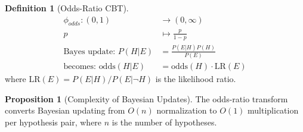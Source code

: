 \documentclass[11pt]{article}
\theoremstyle{definition}
\newtheorem{definition}{Definition}
\newtheorem{proposition}{Proposition}
\begin{document}
\begin{definition}[Odds-Ratio CBT]
\begin{align}
\phi_{odds}: (0,1) &\to (0,\infty) \\
p &\mapsto \frac{p}{1-p} \\
\text{Bayes update: } P(H|E) &= \frac{P(E|H)P(H)}{P(E)} \\
\text{becomes: } \text{odds}(H|E) &= \text{odds}(H) \cdot \text{LR}(E)
\end{align}
where $\text{LR}(E) = P(E|H)/P(E|\neg H)$ is the likelihood ratio.
\end{definition}

\begin{proposition}[Complexity of Bayesian Updates]
\label{prop:bayes-complexity}
The odds-ratio transform converts Bayesian updating from $O(n)$ normalization to $O(1)$ multiplication per hypothesis pair, where $n$ is the number of hypotheses.
\end{proposition}
\end{document}
